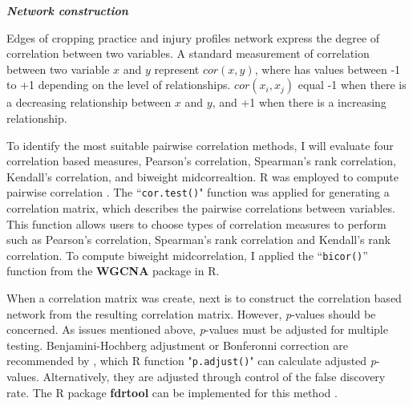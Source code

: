 

\textit{\textbf{Network construction}}


Edges of cropping practice and injury profiles network express the degree of correlation between two variables. A standard measurement of correlation between two variable $x$ and $y$ represent $cor(x,y)$, where has values between -1 to +1 depending on the level of relationships. $cor(x_{i}, x_{j})$ equal -1 when there is a decreasing relationship between $x$ and $y$, and +1 when there is a increasing relationship.

To identify the most suitable pairwise correlation methods, I will evaluate four correlation based measures, Pearson's correlation, Spearman's rank correlation, Kendall's correlation, and biweight midcorrealtion. R was employed to compute pairwise correlation . The ``\texttt{cor.test()}" function was applied for generating a correlation matrix, which describes the pairwise correlations between variables. This function allows users to choose types of correlation measures to perform such as Pearson's correlation, Spearman's rank correlation and Kendall's rank correlation. To compute biweight midcorrelation, I applied the ``\texttt{bicor()}'' function from the \textbf{WGCNA} package  in R. 

When a correlation matrix was create, next is to construct the correlation based network from the resulting correlation matrix. However, \textit{p}-values should be concerned. As issues mentioned above, \textit{p}-values must be adjusted for multiple testing. Benjamini-Hochberg adjustment or Bonferonni correction are recommended by , which R function "\texttt{p.adjust()}" can calculate adjusted \textit{p}-values. Alternatively, they are adjusted through control of the false discovery rate. The R package \textbf{fdrtool} can be implemented for this method .

